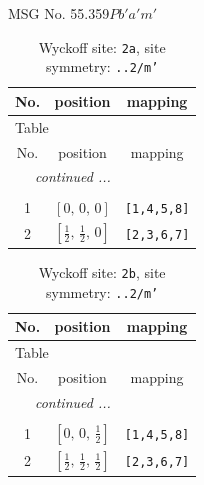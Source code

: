 \documentclass[fleqn,8pt]{jsarticle}
\begin{document}
\setcounter{MaxMatrixCols}{32}

\renewcommand{\tablename}{Table~}
\renewcommand{\figurename}{Figure~}
\begin{center}
\LARGE
MSG No. 55.359\quad$Pb'a'm'$
\end{center}
\renewcommand{\arraystretch}{1.2}
\begin{longtable}{ccc}
\caption{Wyckoff site: {\tt 2a}, site symmetry: {\tt ..2/m'}}
 \\
 \hline \hline
No. & position & mapping \\ \hline \endfirsthead

\multicolumn{2}{l}{\tablename\ \thetable{}} \\
 \hline \hline
No. & position & mapping \\ \hline \endhead

 \hline \hline
\multicolumn{2}{r}{\footnotesize\it continued ...} \\ \endfoot

 \hline \hline
\multicolumn{2}{r}{} \\ \endlastfoot

1 & $\left[ 0,\, 0,\, 0 \right]$ & {\tt [1,4,5,8]} \\ \hline
2 & $\left[ \frac{1}{2},\, \frac{1}{2},\, 0 \right]$ & {\tt [2,3,6,7]} \\
\end{longtable}
\renewcommand{\arraystretch}{1.2}
\begin{longtable}{ccc}
\caption{Wyckoff site: {\tt 2b}, site symmetry: {\tt ..2/m'}}
 \\
 \hline \hline
No. & position & mapping \\ \hline \endfirsthead

\multicolumn{2}{l}{\tablename\ \thetable{}} \\
 \hline \hline
No. & position & mapping \\ \hline \endhead

 \hline \hline
\multicolumn{2}{r}{\footnotesize\it continued ...} \\ \endfoot

 \hline \hline
\multicolumn{2}{r}{} \\ \endlastfoot

1 & $\left[ 0,\, 0,\, \frac{1}{2} \right]$ & {\tt [1,4,5,8]} \\ \hline
2 & $\left[ \frac{1}{2},\, \frac{1}{2},\, \frac{1}{2} \right]$ & {\tt [2,3,6,7]} \\
\end{longtable}
\end{document}
